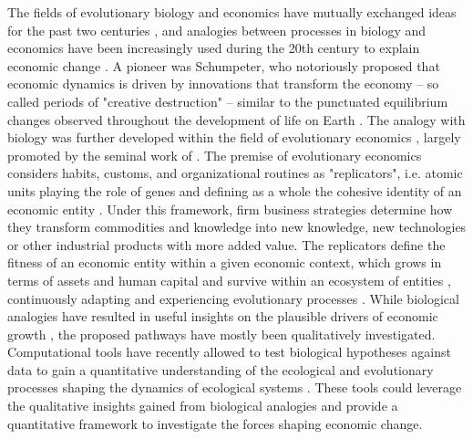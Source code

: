   The fields of evolutionary biology and economics have mutually exchanged ideas for the past two centuries \citep{Dopfer2007}, and analogies between processes in biology and economics have been increasingly used during the 20th century to explain economic change \citep{Ruth1996}.
  A pioneer was Schumpeter, who notoriously proposed that economic dynamics is driven by innovations that transform the economy -- so called periods of "creative destruction" \citep{schumpeter2017theory}-- similar to the punctuated equilibrium changes observed throughout the development of life on Earth \citep{gould1972}.
  The analogy with biology was further developed within the field of evolutionary economics \citep{Hodgson2019}, largely promoted by the seminal work of \cite{nelson1985evolutionary}.
  The premise of evolutionary economics considers habits, customs, and organizational routines as "replicators", i.e. atomic units playing the role of genes and defining as a whole the cohesive identity of an economic entity \citep{Hodgson2019}.
  Under this framework, firm business strategies determine how they transform commodities and knowledge into new knowledge, new technologies or other industrial products with more added value.
  The replicators define the fitness of an economic entity within a given economic context, which grows in terms of assets and human capital and survive within an ecosystem of entities \citep{Hodgson2002}, continuously adapting and experiencing evolutionary processes \citep{Veblen1898}.
  While biological analogies have resulted in useful insights on the plausible drivers of economic growth \citep{Dopfer2007}, the proposed pathways have mostly been qualitatively investigated.
  Computational tools have recently allowed to test biological hypotheses against data to gain a quantitative understanding of the ecological and evolutionary processes shaping the dynamics of ecological systems \citep{Pontarp2019,Boussange2022a,Skeels2022}. These tools could leverage the qualitative insights gained from biological analogies and provide a quantitative framework to investigate the forces shaping economic change.
  
